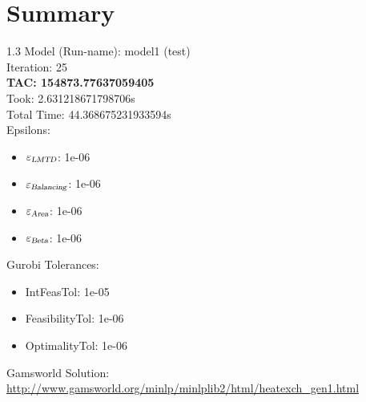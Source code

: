 \documentclass{article}%
\begin{document}
%
\normalsize%
\section{Summary}%
\thispagestyle{plain}%
\begin{spacing}{1.3}%
\Large%
Model (Run-name): model1 (test)\\%
Iteration: 25\\%
\textbf{TAC: 154873.77637059405}\\%
Took: 2.631218671798706s\\%
Total Time: 44.368675231933594s\\%
Epsilons:%
\begin{itemize}%
	\item $\varepsilon_{\textsl{LMTD}}$: 1e-06%
	\item $\varepsilon_{\textsl{Balancing}}$: 1e-06%
	\item $\varepsilon_{\textsl{Area}}$: 1e-06%
	\item $\varepsilon_{\textsl{Beta}}$: 1e-06%
\end{itemize}%
Gurobi Tolerances:%
\begin{itemize}%
	\item IntFeasTol: 1e-05%
	\item FeasibilityTol: 1e-06%
	\item OptimalityTol: 1e-06%
\end{itemize}%
\end{spacing}%
\normalsize%
Gamsworld Solution: \url{http://www.gamsworld.org/minlp/minlplib2/html/heatexch_gen1.html}%
%
\clearpage%
\end{document}
